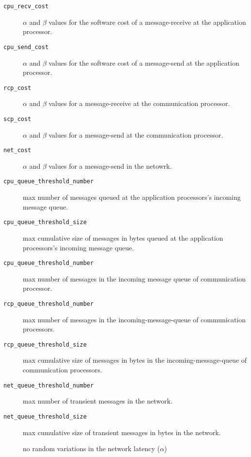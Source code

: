 \begin{item}
\begin{description}
\item[\verb+cpu_recv_cost+] $\alpha$ and  $\beta$ values  for the software
                            cost of a message-receive at the application
                            processor.
\item[\verb+cpu_send_cost+] $\alpha$ and  $\beta$ values  for the software
                            cost of a message-send at the application
                            processor.
\item[\verb+rcp_cost+] $\alpha$ and  $\beta$ values for a message-receive 
                       at the communication processor.
\item[\verb+scp_cost+] $\alpha$ and  $\beta$ values for a message-send
                       at the communication processor.
\item[\verb+net_cost+] $\alpha$ and  $\beta$ values for a message-send
                       in the netowrk.
\item[\verb+cpu_queue_threshold_number+] max number of messages queued
                       at the application processors's incoming message queue.
\item[\verb+cpu_queue_threshold_size+] max cumulative size of messages in bytes
                       queued at the application processors's incoming message 
                       queue.


\item[\verb+cpu_queue_threshold_number+] max number of messages in the incoming
                       message queue of communication processor.   


\item[\verb+rcp_queue_threshold_number+] max number of messages in the 
                       incoming-message-queue of communication processors.                    
\item[\verb+rcp_queue_threshold_size+] max cumulative size of messages in bytes
                       in the incoming-message-queue of communication 
                       processors.

\item[\verb+net_queue_threshold_number+] max number of transient messages in 
                       the network.

\item[\verb+net_queue_threshold_size+] max cumulative size of transient 
                       messages in bytes in the network.

\item[\verb+latency-fixed] no random variations in the network latency 
                           ($\alpha$)


\end{description}
\end{item}
